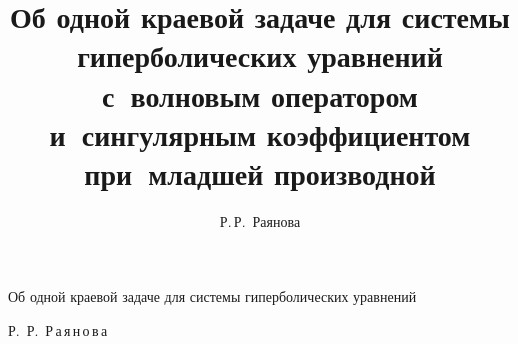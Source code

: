 %

% 

%

%

%



\renewcommand{\firstpage}{144}

\renewcommand{\lastpage}{149}




















\title{Об одной краевой задаче для системы гиперболических уравнений с~волновым оператором и~сингулярным коэффициентом при~младшей производной}%

{Об одной краевой задаче для системы гиперболических уравнений}%



\author{Р.\,Р.~Раянова}%

{Р.~Р.~Р\,а\,я\,н\,о\,в\,а}%













